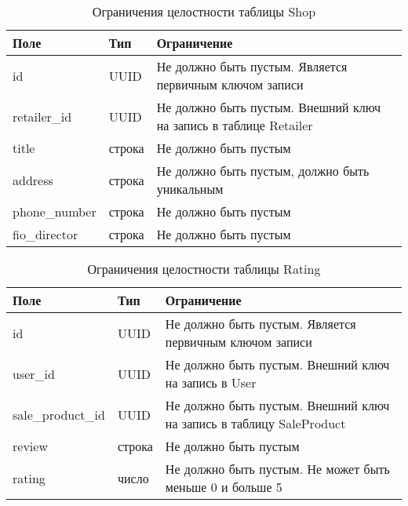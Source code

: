 \begin{table}[!h]
	\begin{center}
		\begin{threeparttable}
			\caption{Ограничения целостности таблицы Shop}
			\label{tbl:entity_shop}
			\begin{tabular}{|p{4.5cm}|p{2.5cm}|p{8.5cm}|}
				\hline 
				\textbf{Поле} & \textbf{Тип} & \textbf{Ограничение}  \\
				\hline
				id & UUID & Не должно быть пустым. Является первичным ключом записи  \\
				\hline
				retailer\_id & UUID & Не должно быть пустым. Внешний ключ на запись в таблице Retailer   \\
				\hline
				title & строка & Не должно быть пустым \\
				\hline
				address & строка & Не должно быть пустым, должно быть уникальным  \\
				\hline
				phone\_number & строка & Не должно быть пустым  \\
				\hline
				fio\_director & строка & Не должно быть пустым  \\
				\hline
			\end{tabular}
		\end{threeparttable}			
	\end{center}
\end{table}


\begin{table}[!h]
	\begin{center}
		\begin{threeparttable}
			\caption{Ограничения целостности таблицы Rating}
			\label{tbl:entity_rating}
			\begin{tabular}{|p{4.5cm}|p{2.5cm}|p{8.5cm}|}
				\hline 
				\textbf{Поле} & \textbf{Тип} & \textbf{Ограничение}  \\
				\hline
				id & UUID & Не должно быть пустым. Является первичным ключом записи  \\
				\hline
				user\_id & UUID & Не должно быть пустым. Внешний ключ на запись в User  \\
				\hline
				sale\_product\_id & UUID & Не должно быть пустым. Внешний ключ на запись в таблицу SaleProduct  \\
				\hline
				review & строка & Не должно быть пустым \\
				\hline
				rating & число & Не должно быть пустым. Не может быть меньше 0 и больше 5 \\
				\hline
			\end{tabular}
		\end{threeparttable}			
	\end{center}
\end{table}

